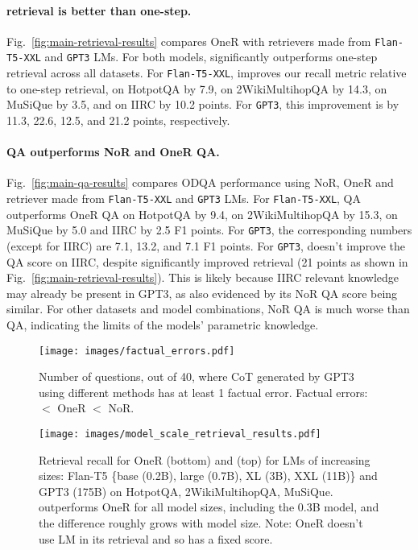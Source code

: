 \paragraph{\iconsys retrieval is better than one-step. }

Fig.~\ref{fig:main-retrieval-results} compares OneR with \iconsys retrievers made from \texttt{Flan-T5-XXL} and \texttt{GPT3} LMs. For both models, \iconsys significantly outperforms one-step retrieval across all datasets. For \texttt{Flan-T5-XXL}, \iconsys improves our recall metric relative to one-step retrieval, on HotpotQA by 7.9, on 2WikiMultihopQA by 14.3, on MuSiQue by 3.5, and on IIRC by 10.2 points. For \texttt{GPT3}, this improvement is by 11.3, 22.6, 12.5, and 21.2 points, respectively.

\paragraph{\iconsys QA outperforms NoR and OneR QA.}

Fig.~\ref{fig:main-qa-results} compares ODQA performance using NoR, OneR and \iconsys retriever made from \texttt{Flan-T5-XXL} and \texttt{GPT3} LMs. For \texttt{Flan-T5-XXL}, \iconsys QA outperforms OneR QA on HotpotQA by 9.4, on 2WikiMultihopQA by 15.3, on MuSiQue by 5.0 and IIRC by 2.5 F1 points. For \texttt{GPT3}, the corresponding numbers (except for IIRC) are 7.1, 13.2, and 7.1 F1 points. For \texttt{GPT3}, \iconsys doesn't improve the QA score on IIRC, despite significantly improved retrieval (21 points as shown in Fig.~\ref{fig:main-retrieval-results}). This is likely because IIRC relevant knowledge may already be present in GPT3, as also evidenced by its NoR QA score being similar. For other datasets and model combinations, NoR QA is much worse than \iconsys QA, indicating the limits of the models' parametric knowledge.

\begin{figure}[ht]
\centering
\texttt{[image: images/factual\_errors.pdf]}
\caption{Number of questions, out of 40, where CoT generated by GPT3 using different methods has at least 1 factual error. Factual errors: \iconsys $<$ OneR $<$ NoR.}
\label{fig:cot-factual-errors}
\end{figure}

\begin{figure*}[ht]
\centering
\texttt{[image: images/model\_scale\_retrieval\_results.pdf]}
\caption{Retrieval recall for OneR (bottom) and \iconsys (top) for LMs of increasing sizes: Flan-T5 \{base (0.2B), large (0.7B), XL (3B), XXL (11B)\} and GPT3 (175B) on HotpotQA, 2WikiMultihopQA, MuSiQue. \iconsys outperforms OneR for all model sizes, including the 0.3B model, and the difference roughly grows with model size. Note: OneR doesn't use LM in its retrieval and so has a fixed score.}
\label{fig:model-scale-retrieval-results}
\end{figure*}

